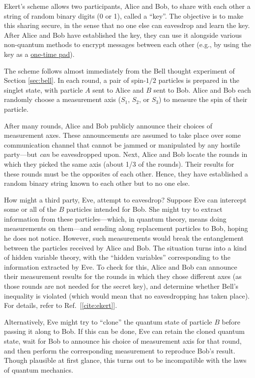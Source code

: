 \documentclass[pra,12pt]{revtex4-2}
\begin{document}
Ekert's scheme allows two participants, Alice and Bob, to share with
each other a string of random binary digits (0 or 1), called a
``key''.  The objective is to make this sharing secure, in the sense
that no one else can eavesdrop and learn the key.  After Alice and Bob
have established the key, they can use it alongside various
non-quantum methods to encrypt messages between each other (e.g., by using the key as a
\href{https://en.wikipedia.org/wiki/One-time_pad}{one-time pad}).

The scheme follows almost immediately from the Bell thought experiment
of Section \ref{sec:bell}.  In each round, a pair of spin-$1/2$
particles is prepared in the singlet state, with particle $A$ sent to
Alice and $B$ sent to Bob.  Alice and Bob each randomly choose a
measurement axis ($S_1$, $S_2$, or $S_3$) to measure the spin of their
particle.

After many rounds, Alice and Bob publicly announce their choices of
measurement axes.  These announcements are assumed to take place over
some communication channel that cannot be jammed or manipulated by any
hostile party---but \textit{can} be eavesdropped upon.  Next, Alice
and Bob locate the rounds in which they picked the same axis (about
1/3 of the rounds).  Their results for these rounds must be the
opposites of each other.  Hence, they have established a random binary
string known to each other but to no one else.

How might a third party, Eve, attempt to eavesdrop?  Suppose Eve can
intercept some or all of the $B$ particles intended for Bob.  She
might try to extract information from these particles---which, in
quantum theory, means doing measurements on them---and sending along
replacement particles to Bob, hoping he does not notice.  However,
such measurements would break the entanglement between the particles
received by Alice and Bob.  The situation turns into a kind of hidden
variable theory, with the ``hidden variables'' corresponding to the
information extracted by Eve.  To check for this, Alice and Bob can
announce their measurement results for the rounds in which they chose
different axes (as those rounds are not needed for the secret key),
and determine whether Bell's inequality is violated (which would mean
that no eavesdropping has taken place).  For details, refer to
Ref.~[\ref{cite:ekert}].

Alternatively, Eve might try to ``clone'' the quantum state of
particle $B$ before passing it along to Bob.  If this can be done, Eve
can retain the cloned quantum state, wait for Bob to announce his
choice of measurement axis for that round, and then perform the
corresponding measurement to reproduce Bob's result.  Though plausible
at first glance, this turns out to be incompatible with the laws of
quantum mechanics.
\end{document}
